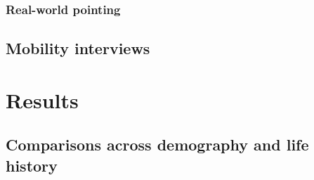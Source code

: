 		\subsubsection{Real-world pointing}
		\label{sec:2.2.2}

	\subsection{Mobility interviews}
	\label{sec:2.1}

\section{Results}
\label{sec:3}
	\subsection{Comparisons across demography and life history}
	\label{sec:3.1}
